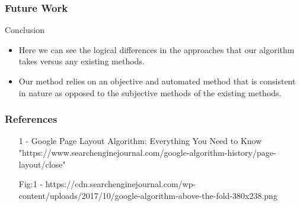 \documentclass[11pt]{beamer}
\begin{document}
\begin{frame}
\frametitle{Future Work}
\end{frame}
	\begin{frame}{Conclusion}
		\begin{itemize}
			\item Here we can see the logical differences in the approaches that our algorithm takes versus any existing methods.
			\item Our method relies on an objective and automated method that is consistent in nature as opposed to the subjective methods of the existing methods.
		\end{itemize}
	\end{frame}
	\begin{frame}
		\frametitle{\LARGE \textbf{References}}
		\begin{itemize}
			\item [1] - Google Page Layout Algorithm: Everything You Need to Know 
			"https://www.searchenginejournal.com/google-algorithm-history/page-layout/close"
			\item [Fig:1] - https://cdn.searchenginejournal.com/wp-content/uploads/2017/10/google-algorithm-above-the-fold-380x238.png
		\end{itemize}
	\end{frame}
\end{document}
